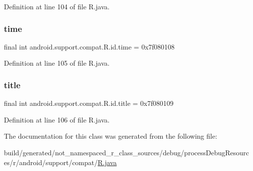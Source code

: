 Definition at line 104 of file R.\+java.

\mbox{\label{classandroid_1_1support_1_1compat_1_1_r_1_1id_a49cf2219fd53fac400ba97ac46a60f87}} 
\subsubsection{\texorpdfstring{time}{time}}
{\footnotesize\ttfamily final int android.\+support.\+compat.\+R.\+id.\+time = 0x7f080108\hspace{0.3cm}{\ttfamily [static]}}



Definition at line 105 of file R.\+java.

\mbox{\label{classandroid_1_1support_1_1compat_1_1_r_1_1id_a40ae774b3537286b4a997e8cbb09e476}} 
\subsubsection{\texorpdfstring{title}{title}}
{\footnotesize\ttfamily final int android.\+support.\+compat.\+R.\+id.\+title = 0x7f080109\hspace{0.3cm}{\ttfamily [static]}}



Definition at line 106 of file R.\+java.



The documentation for this class was generated from the following file\+:\begin{DoxyCompactItemize}
\item 
build/generated/not\+\_\+namespaced\+\_\+r\+\_\+class\+\_\+sources/debug/process\+Debug\+Resources/r/android/support/compat/\mbox{\hyperlink{android_2support_2compat_2_r_8java}{R.\+java}}\end{DoxyCompactItemize}
